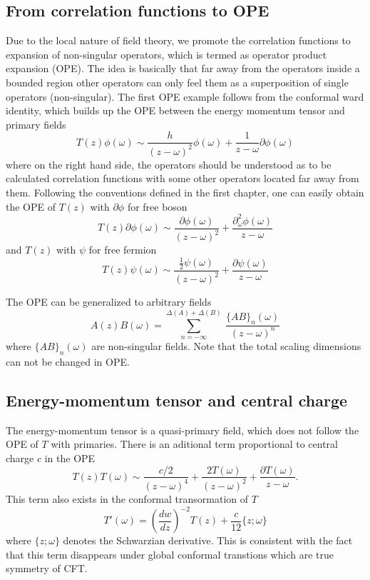 \documentclass[submission, PhysLectNotes]{SciPost}
\begin{document}
\subsection{From correlation functions to OPE}
Due to the local nature of field theory, we promote the correlation functions to expansion of non-singular operators, which is termed as operator product expansion (OPE). The idea is basically that far away from the operators inside a bounded region other operators can only feel them as a superposition of single operators (non-singular). The first OPE example follows from the conformal ward identity, which builds up the OPE between the energy momentum tensor and primary fields
\begin{equation}
	T(z) \phi(\omega) \sim \frac{h}{{\left(z-\omega\right)}^2} \phi(\omega) + \frac{1}{z-\omega} \partial \phi(\omega)
\end{equation}
where on the right hand side, the operators should be understood as to be calculated correlation functions with some other operators located far away from them.  Following the conventions defined in the first chapter, one can easily obtain the OPE of $T(z)$ with $\partial \phi$ for free boson
\begin{equation}
T(z) \partial\phi(\omega) \sim \frac{\partial \phi(\omega)}{{\left(z-\omega\right)}^2} + \frac{\partial_\omega^2 \phi(\omega)}{z-\omega}
\end{equation}
and $T(z)$ with $\psi$ for free fermion
\begin{equation}
T(z) \psi(\omega) \sim \frac{\frac{1}{2} \psi(\omega)}{{\left(z-\omega\right)}^2} + \frac{\partial \psi(\omega)}{z-\omega}
\end{equation}

The OPE can be generalized to arbitrary fields
\begin{equation}
A(z) B(\omega) = \sum_{n=-\infty}^{\Delta(A) + \Delta(B)}\  \frac{{\{AB\}}_n(\omega)}{{\left(z-\omega\right)}^n}
\end{equation}
where ${\{AB\}}_n(\omega)$ are non-singular fields. Note that the total scaling dimensions can not be changed in OPE\@.



\subsection{Energy-momentum tensor and central charge}
The energy-momentum tensor is a quasi-primary field, which does not follow the OPE of $T$ with primaries. There is an aditional term proportional to central charge $c$ in the OPE
\begin{equation}
T(z)T(\omega) \sim \frac{c/2}{{\left(z-\omega\right)}^4} + \frac{2 T(\omega)}{{\left(z-\omega\right)}^2} + \frac{\partial T(\omega)}{z-\omega}.
\end{equation}
This term also exists in the conformal transormation of $T$
\begin{equation}
T'(\omega) = {\left(\frac{dw}{dz}\right)}^{-2} T(z) + \frac{c}{12}\{z;\omega\}
\end{equation}
where $\{z;\omega\}$ denotes the Schwarzian derivative. This is consistent with the fact that this term disappears under global conformal transtions which are true symmetry of CFT\@.
\end{document}

